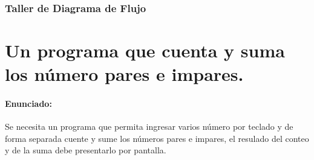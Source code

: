 \documentclass[a4paper,12pt,spanish]{article}
\begin{document}
\subsubsection{Taller de Diagrama de Flujo}
\section{Un programa que cuenta y suma los número pares e impares. }
\label{sec:el-clasico-programa-3}
\paragraph{Enunciado:}

  Se necesita un programa que permita ingresar varios número  por
teclado y de forma separada cuente y sume los números pares e impares, el resulado del conteo y de la suma debe presentarlo por pantalla.
\end{document}
